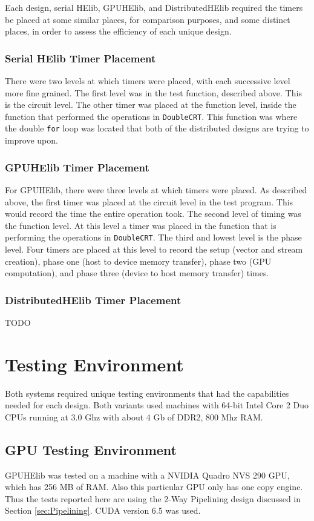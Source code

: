 Each design, serial HElib, GPUHElib, and DistributedHElib required the timers be placed at some similar places, for comparison purposes, and some distinct places, in order to assess the efficiency of each unique design.

\subsubsection{Serial HElib Timer Placement}
There were two levels at which timers were placed, with each successive level more fine grained. The first level was in the test function, described above. This is the circuit level. The other timer was placed at the function level, inside the function that performed the operations in \verb|DoubleCRT|. This function was where the double \verb|for| loop was located that both of the distributed designs are trying to improve upon.

\subsubsection{GPUHElib Timer Placement}
For GPUHElib, there were three levels at which timers were placed. As described above, the first timer was placed at the circuit level in the test program. This would record the time the entire operation took. The second level of timing was the function level. At this level a timer was placed in the function that is performing the operations in \verb|DoubleCRT|. The third and lowest level is the phase level. Four timers are placed at this level to record the setup (vector and stream creation), phase one (host to device memory transfer), phase two (GPU computation), and phase three (device to host memory transfer) times.

\subsubsection{DistributedHElib Timer Placement}
TODO

\section{Testing Environment} \label{sec:TestingEnvironment}
Both systems required unique testing environments that had the capabilities needed for each design. Both variants used machines with 64-bit Intel Core 2 Duo CPUs running at 3.0 Ghz with about 4 Gb of DDR2, 800 Mhz RAM.

\subsection{GPU Testing Environment}
GPUHElib was tested on a machine with a NVIDIA Quadro NVS 290 GPU, which has 256 MB of RAM. Also this particular GPU only has one copy engine. Thus the tests reported here are using the 2-Way Pipelining design discussed in Section \ref{sec:Pipelining}. CUDA version 6.5 was used.

